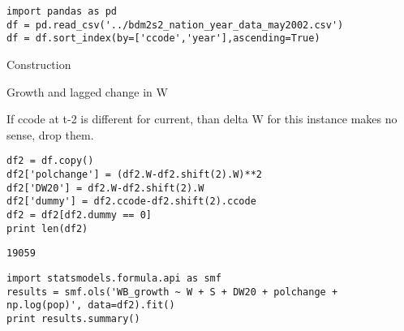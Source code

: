 \documentclass[12pt,fleqn]{article}\usepackage{common}
\begin{document}
\begin{verbatim}
import pandas as pd
df = pd.read_csv('../bdm2s2_nation_year_data_may2002.csv')
df = df.sort_index(by=['ccode','year'],ascending=True)
\end{verbatim}



Construction




Growth and lagged change in W

If ccode at t-2 is different for current, than delta W for this instance
makes no sense, drop them.

\begin{verbatim}
df2 = df.copy()
df2['polchange'] = (df2.W-df2.shift(2).W)**2
df2['DW20'] = df2.W-df2.shift(2).W
df2['dummy'] = df2.ccode-df2.shift(2).ccode
df2 = df2[df2.dummy == 0]
print len(df2)
\end{verbatim}

\begin{verbatim}
19059
\end{verbatim}

\begin{verbatim}
import statsmodels.formula.api as smf
results = smf.ols('WB_growth ~ W + S + DW20 + polchange + np.log(pop)', data=df2).fit()
print results.summary()
\end{verbatim}
\end{document}

